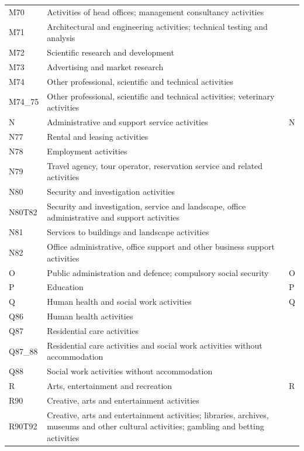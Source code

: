 \documentclass[12pt]{article}
\begin{document}
\begin{tabularx}{\textwidth}{l X l}
M70     & Activities of head offices; management consultancy activities &  \\
M71     & Architectural and engineering activities; technical testing and analysis &  \\
M72     & Scientific research and development &  \\
M73     & Advertising and market research &  \\
M74     & Other professional, scientific and technical activities &  \\
M74\_75 & Other professional, scientific and technical activities; veterinary activities &  \\
N       & Administrative and support service activities & N \\
N77     & Rental and leasing activities &  \\
N78     & Employment activities &  \\
N79     & Travel agency, tour operator, reservation service and related activities &  \\
N80     & Security and investigation activities &  \\
N80T82  & Security and investigation, service and landscape, office administrative and support activities &  \\
N81     & Services to buildings and landscape activities &  \\
N82     & Office administrative, office support and other business support activities &  \\
O       & Public administration and defence; compulsory social security & O \\
P       & Education & P \\
Q       & Human health and social work activities & Q \\
Q86     & Human health activities &  \\
Q87     & Residential care activities &  \\
Q87\_88 & Residential care activities and social work activities without accommodation &  \\
Q88     & Social work activities without accommodation &  \\
R       & Arts, entertainment and recreation & R \\
R90     & Creative, arts and entertainment activities &  \\
R90T92  & Creative, arts and entertainment activities; libraries, archives, museums and other cultural activities; gambling and betting activities &  \\

\end{tabularx}
\end{document}
